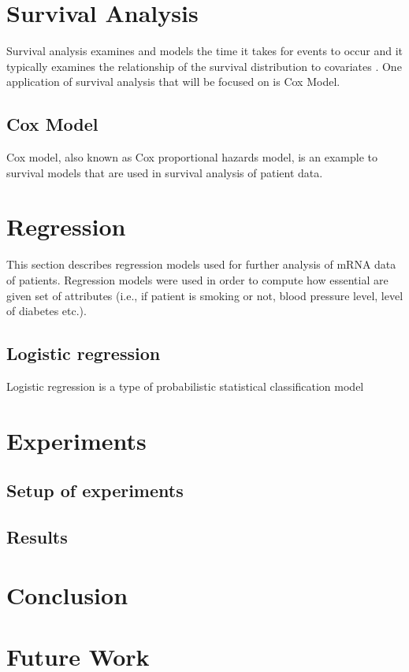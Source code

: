 \documentclass{ba-kecs}
\numberwithin{figure}{section}
\numberwithin{equation}{section}
\begin{document}
\section{Survival Analysis}
Survival analysis examines and models the time it takes for events to occur and it typically examines the relationship of the survival distribution to covariates \cite{cox}. One application of survival analysis that will be focused on is Cox Model.
\subsection{Cox Model}
Cox model, also known as Cox proportional hazards model, is an example to survival models that are used in survival analysis of patient data. 

\section{Regression}
This section describes regression models used for further analysis of mRNA data of patients. Regression models were used in order to compute how essential are given set of attributes (i.e., if patient is smoking or not, blood pressure level, level of diabetes etc.).
\subsection{Logistic regression}
Logistic regression is a type of probabilistic statistical classification model


\section{Experiments}
\subsection{Setup of experiments}
\subsection{Results}

\section{Conclusion}

\section{Future Work}
\end{document}
